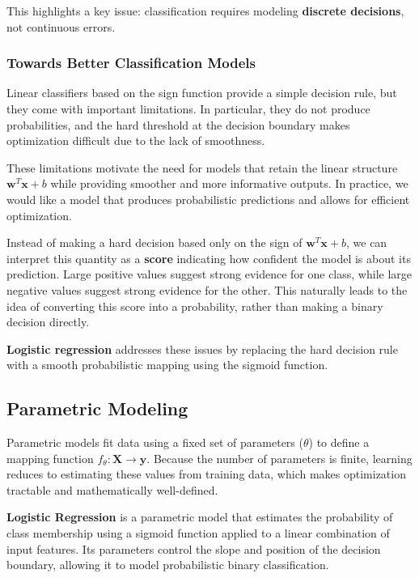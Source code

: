 \documentclass{article}
\begin{document}
This highlights a key issue: classification requires modeling \textbf{discrete decisions}, not continuous errors.

\subsubsection{Towards Better Classification Models}

Linear classifiers based on the sign function provide a simple decision rule, but they come with important limitations. In particular, they do not produce probabilities, and the hard threshold at the decision boundary makes optimization difficult due to the lack of smoothness.

These limitations motivate the need for models that retain the linear structure $\mathbf{w}^T \mathbf{x} + b$ while providing smoother and more informative outputs. In practice, we would like a model that produces probabilistic predictions and allows for efficient optimization.

Instead of making a hard decision based only on the sign of $\mathbf{w}^T \mathbf{x} + b$, we can interpret this quantity as a \textbf{score} indicating how confident the model is about its prediction. Large positive values suggest strong evidence for one class, while large negative values suggest strong evidence for the other. This naturally leads to the idea of converting this score into a probability, rather than making a binary decision directly.

\textbf{Logistic regression} addresses these issues by replacing the hard decision rule with a smooth probabilistic mapping using the sigmoid function.

\subsection{Parametric Modeling}

Parametric models fit data using a fixed set of parameters ($\theta$) to define a mapping function $f_\theta:\textbf{X}\rightarrow\textbf{y}$. Because the number of parameters is finite, learning reduces to estimating these values from training data, which makes optimization tractable and mathematically well-defined.

\textbf{Logistic Regression} is a parametric model that estimates the probability of class membership using a sigmoid function applied to a linear combination of input features. Its parameters control the slope and position of the decision boundary, allowing it to model probabilistic binary classification.
\end{document}
